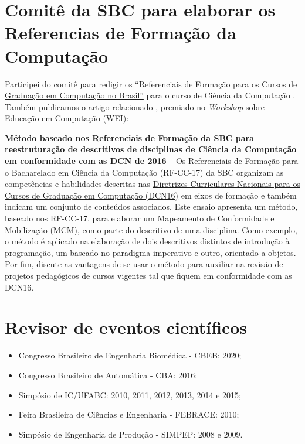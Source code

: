 \section{Comitê da SBC para elaborar os Referencias de Formação da Computação}

Participei do comitê para redigir os \href{https://sol.sbc.org.br/livros/index.php/sbc/catalog/book/63}{``Referenciais de Formação para os Cursos de Graduação em Computação no Brasil''} para o curso de Ciência da Computação \cite{2017:Calsavara.Serra.ea}. Também publicamos o artigo relacionado \cite{2018:Calsavara.Serra.ea}, premiado no \textit{Workshop} sobre Educação em Computação (WEI):

\begin{minipage}{0.8\linewidth}
\textbf{Método baseado nos Referenciais de Formação da SBC para reestruturação de descritivos de disciplinas de Ciência da Computação em conformidade com as DCN de 2016} -- Os  Referenciais  de  Formação  para  o  Bacharelado  em  Ciência  da Computação  (RF-CC-17)  da  SBC  organizam  as  competências  e  habilidades descritas  nas  \href{http://portal.mec.gov.br/index.php?option=+com_docman&view=download&alias=52101-rces005-16-pdf&category_slug=+novembro-2016-pdf&Itemid=30192}{Diretrizes  Curriculares  Nacionais  para  os  Cursos  de  Graduação em Computação (DCN16)} em eixos de formação e também indicam um conjunto de  conteúdos  associados.  Este  ensaio  apresenta  um  método,  baseado  nos  RF-CC-17, para elaborar um Mapeamento de Conformidade e Mobilização (MCM), como parte do descritivo de uma disciplina. Como exemplo, o método é aplicado na  elaboração  de  dois  descritivos  distintos  de  introdução  à  programação,  um baseado no paradigma imperativo e outro, orientado a objetos. Por fim, discute as  vantagens  de  se  usar  o  método  para  auxiliar  na  revisão  de  projetos pedagógicos de cursos vigentes tal que fiquem em conformidade com as DCN16.
\end{minipage}

\section{Revisor de eventos científicos}

\begin{itemize}
    \item Congresso Brasileiro de Engenharia Biomédica - CBEB: 2020;
    \item Congresso Brasileiro de Automática - CBA: 2016;
    \item Simpósio de IC/UFABC: 2010, 2011, 2012, 2013, 2014 e 2015;
    \item Feira Brasileira de Ciências e Engenharia - FEBRACE: 2010;
    \item Simpósio de Engenharia de Produção - SIMPEP: 2008 e 2009.
\end{itemize}

